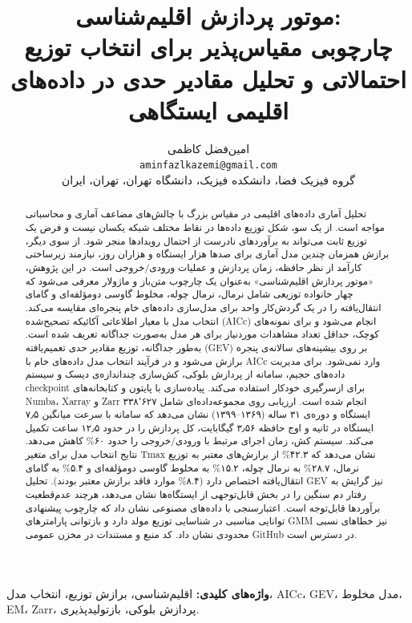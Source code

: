 \documentclass[12pt,a4paper,twocolumn]{article}
\title{%
	\large
	موتور پردازش اقلیم‌شناسی: \\[0.3cm]
	\normalsize
	چارچوبی مقیاس‌پذیر برای انتخاب توزیع احتمالاتی و تحلیل مقادیر حدی در داده‌های اقلیمی ایستگاهی
}
\author{%
	امین‌فضل کاظمی \\[0.2cm]
	\small
	\texttt{aminfazlkazemi@gmail.com} \\[0.1cm]
	\small
	گروه فیزیک فضا، دانشکده فیزیک، دانشگاه تهران، تهران، ایران
}
\date{}
\begin{document}
\maketitle

\begin{abstract}
\noindent
تحلیل آماری داده‌های اقلیمی در مقیاس بزرگ با چالش‌های مضاعف آماری و محاسباتی مواجه است. از یک سو، شکل توزیع داده‌ها در نقاط مختلف شبکه یکسان نیست و فرض یک توزیع ثابت می‌تواند به برآوردهای نادرست از احتمال رویدادها منجر شود. از سوی دیگر، برازش همزمان چندین مدل آماری برای صدها هزار ایستگاه و هزاران روز، نیازمند زیرساختی کارآمد از نظر حافظه، زمان پردازش و عملیات ورودی/خروجی است. در این پژوهش، «موتور پردازش اقلیم‌شناسی» به‌عنوان یک چارچوب متن‌باز و ماژولار معرفی می‌شود که چهار خانواده توزیعی شامل نرمال، نرمال چوله، مخلوط گاوسی دومؤلفه‌ای و گامای انتقال‌یافته را در یک گردش‌کار واحد برای مدل‌سازی داده‌های خام پنجره‌ای مقایسه می‌کند. انتخاب مدل با معیار اطلاعاتی آکائیکه تصحیح‌شده (AICc) انجام می‌شود و برای نمونه‌های کوچک، حداقل تعداد مشاهدات موردنیاز برای هر مدل به‌صورت جداگانه تعریف شده است. به‌طور جداگانه، توزیع مقادیر حدی تعمیم‌یافته (GEV) بر روی بیشینه‌های سالانه‌ی پنجره برازش می‌شود و در فرآیند انتخاب مدل داده‌های خام با AICc وارد نمی‌شود. برای مدیریت داده‌های حجیم، سامانه از پردازش بلوکی، کش‌سازی چنداندازه‌ی دیسک و سیستم checkpoint برای ازسرگیری خودکار استفاده می‌کند. پیاده‌سازی با پایتون و کتابخانه‌های Numba، Xarray و Zarr انجام شده است. ارزیابی روی مجموعه‌داده‌ای شامل ۳۳۸٬۶۲۷ ایستگاه و دوره‌ی ۳۱ ساله (۱۳۶۹–۱۳۹۹) نشان می‌دهد که سامانه با سرعت میانگین ۷٫۵ ایستگاه در ثانیه و اوج حافظه ۳٫۵۶ گیگابایت، کل پردازش را در حدود ۱۲٫۵ ساعت تکمیل می‌کند. سیستم کش، زمان اجرای مرتبط با ورودی/خروجی را حدود ۶۰\% کاهش می‌دهد. نتایج انتخاب مدل برای متغیر Tmax نشان می‌دهد که ۴۲.۳\% از برازش‌های معتبر به توزیع نرمال، ۲۸.۷\% به نرمال چوله، ۱۵.۲\% به مخلوط گاوسی دومؤلفه‌ای و ۵.۴\% به گامای انتقال‌یافته اختصاص دارد (۸.۴\% موارد فاقد برازش معتبر بودند). تحلیل GEV نیز گرایش به رفتار دم سنگین را در بخش قابل‌توجهی از ایستگاه‌ها نشان می‌دهد، هرچند عدم‌قطعیت برآوردها قابل‌توجه است. اعتبارسنجی با داده‌های مصنوعی نشان داد که چارچوب پیشنهادی توانایی مناسبی در شناسایی توزیع مولد دارد و بازتوانی پارامترهای GMM نیز خطاهای نسبی محدودی نشان داد. کد منبع و مستندات در مخزن عمومی GitHub در دسترس است.
\end{abstract}

\noindent
\textbf{واژه‌های کلیدی:} اقلیم‌شناسی، برازش توزیع، انتخاب مدل، AICc، GEV، مدل مخلوط، EM، Zarr، پردازش بلوکی، بازتولیدپذیری.
\end{document}
